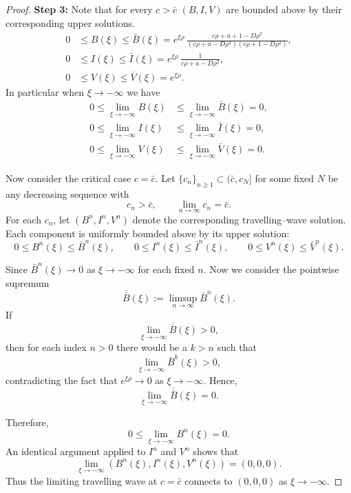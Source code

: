 \documentclass[11pt]{article}
\theoremstyle{definition}
\begin{document}
{\begin{proof}
\noindent \textbf{Step 3:}
Note that for every $c>\bar c$ $(B,I,V)$ are bounded above by their corresponding upper
solutions. 
\begin{align}
    0 &\le B(\xi) \le \bar{B}(\xi)
      = e^{\xi \rho}\,
        \frac{c\rho + a + 1 - D\rho^{2}}
        {(c\rho + a - D\rho^{2})(c\rho + 1 - D\rho^{2})}, \\
    0 &\le I(\xi) \le \bar{I}(\xi)
      = e^{\xi \rho}\,
        \frac{1}{c\rho + a - D\rho^{2}}, \\
    0 &\le V(\xi) \le \bar{V}(\xi)
      = e^{\xi \rho}.
\end{align}
In particular when $\xi \to - \infty$  we have 
\begin{align}
    0 \le \lim_{\xi\to -\infty} B(\xi)
      &\le \lim_{\xi\to -\infty} \bar{B}(\xi) = 0,\\
    0 \le \lim_{\xi\to -\infty} I(\xi)
      &\le \lim_{\xi\to -\infty} \bar{I}(\xi) = 0,\\
    0 \le \lim_{\xi\to -\infty} V(\xi)
      &\le \lim_{\xi\to -\infty} \bar{V}(\xi) = 0.
\end{align}

\medskip

Now consider the critical case $c = \bar c$.  
Let $\{c_n\}_{n\ge1 } \subset (\bar{c}, c_N]$ for some fixed $N$ be any decreasing sequence with
\[
c_n > \bar c, \qquad \lim_{n\to\infty} c_n = \bar c.
\]
For each $c_n$, let $(B^n, I^n, V^n)$ denote the corresponding travelling–wave
solution. Each component is uniformly bounded above by its upper solution:
\[
0 \le B^n(\xi) \le \bar B^n(\xi), \qquad
0 \le I^n(\xi) \le \bar I^n(\xi), \qquad
0 \le V^n(\xi) \le \bar V^n(\xi).
\]

Since $\bar B^n(\xi) \to 0$ as $\xi\to -\infty$ for each fixed $n$. Now we consider the
pointwise supremum
\[
\overline{\overline{B}}(\xi)
    := \limsup_{n\to\infty} \bar B^n(\xi).
\]
If 
\[
\lim_{\xi\to -\infty} \overline{\overline{B}}(\xi) > 0,
\]
then for each index $n>0$ there would be a $k>n$ such that 
\[
\lim_{\xi\to -\infty} \bar B^{k}(\xi)> 0,
\]
contradicting the fact that $e^{\xi\rho}\to 0$ as $\xi\to -\infty$.  
Hence,
\[
\lim_{\xi\to -\infty} \overline{\overline{B}}(\xi)=0.
\]

Therefore,
\[
0 \le \lim_{\xi\to -\infty} B^{n}(\xi) = 0.
\]
An identical argument applied to $I^n$ and $V^n$ shows that
\[
\lim_{\xi\to -\infty} (B^{n}(\xi), I^{n}(\xi), V^{n}(\xi))
    = (0,0,0).
\]
Thus the limiting travelling wave at $c=\bar c$ connects to $(0,0,0)$ as
$\xi\to -\infty$.



\end{proof}}
\end{document}
